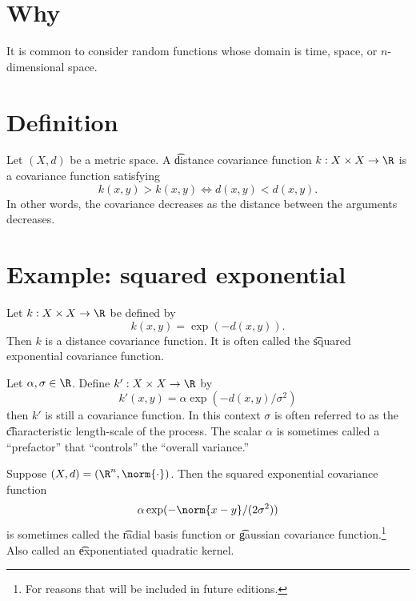 

\section*{Why}

It is common to consider random functions whose domain is time, space, or $n$-dimensional space.

\section*{Definition}

Let $(X, d)$ be a metric space. A \t{distance covariance function} $k: X \times X \to \R $ is a covariance function satisfying
\[
k(x, y) > k(x, y) \iff d(x, y) < d(x, y).
\]
In other words, the covariance decreases as the distance between the arguments decreases.

\section*{Example: squared exponential}

Let $k: X \times X \to \R $ be defined by
\[
k(x, y) = \exp(-d(x, y)).
\]
Then $k$ is a distance covariance function.
It is often called the \t{squared exponential covariance function}.

Let $\alpha , \sigma  \in \R $.
Define $k': X \times X \to \R $ by
\[
k'(x, y) = \alpha \exp(-d(x, y)/\sigma ^2)
\]
then $k'$ is still a covariance function.
In this context $\sigma $ is often referred to as the \t{characteristic length-scale} of the process.
The scalar $\alpha $ is sometimes called a ``prefactor'' that ``controls'' the ``overall variance.''

Suppose $(X, d) = (\R ^n, \norm{\cdot })$.
Then the squared exponential covariance function
\[
\alpha \exp(-\norm{x - y}/(2\sigma ^2))
\]
is sometimes called the \t{radial basis function} or \t{gaussian covariance function}.\footnote{For reasons that will be included in future editions.}
Also called an \t{exponentiated quadratic kernel}.
